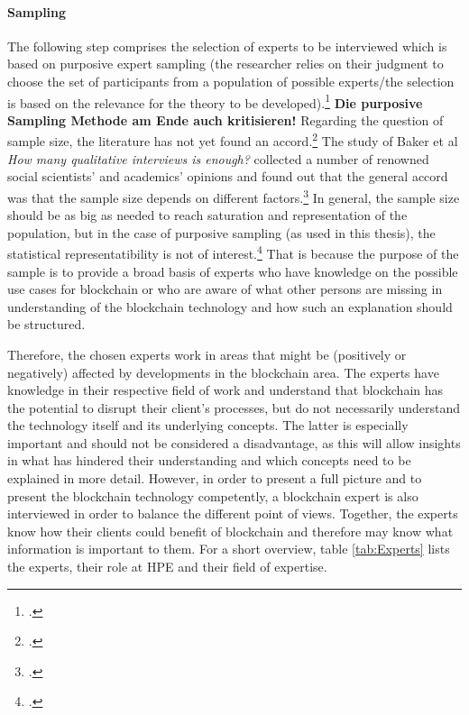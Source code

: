 \paragraph{Sampling} The following step comprises the selection of experts to be interviewed which is based on purposive expert sampling (the researcher relies on their judgment to choose the set of participants from a population of possible experts/the selection is based on the relevance for the theory to be developed).\footcites[Cf.][p.137 et seqq]{Flickintroductionqualitativeresearch2009}[cf.][p.16]{EdwardsWhatqualitativeinterviewing2013}
\textbf{Die purposive Sampling Methode am Ende auch kritisieren!}
Regarding the question of sample size, the literature has not yet found an accord.\footcites[Cf. in addition][p.1]{MorseDeterminingsamplesize2000}[cf.][p.134]{KrugerqualitativeInhaltsanalyseMethode2004} The study of Baker et al \textit{How many qualitative interviews is enough?} collected a number of renowned social scientists' and academics' opinions and found out that the general accord was that the sample size depends on different factors.\footcites[Cf.][p.4 et seqq]{BakerHowmanyqualitative2012} In general, the sample size should be as big as needed to reach saturation and representation of the population, but in the case of purposive sampling (as used in this thesis), the statistical representatibility is not of interest.\footcite[Cf.][p.144]{MasonQualitativeresearching2002} That is because the purpose of the sample is to provide a broad basis of experts who have knowledge on the possible use cases for blockchain or who are aware of what other persons are missing in understanding of the blockchain technology and how such an explanation should be structured.

Therefore, the chosen experts work in areas that might be (positively or negatively) affected by developments in the blockchain area. The experts have knowledge in their respective field of work and understand that blockchain has the potential to disrupt their client's processes, but do not necessarily understand the technology itself and its underlying concepts. The latter is especially important and should not be considered a disadvantage, as this will allow insights in what has hindered their understanding and which concepts need to be explained in more detail. However, in order to present a full picture and to present the blockchain technology competently, a blockchain expert is also interviewed in order to balance the different point of views. Together, the experts know how their clients could benefit of blockchain and therefore may know what information is important to them. For a short overview, table \ref{tab:Experts} lists the experts, their role at HPE and their field of expertise.


